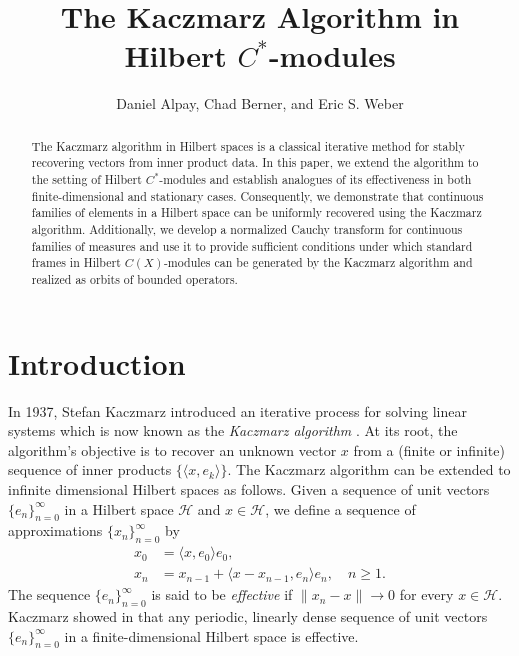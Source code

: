 \documentclass[11pt]{amsart}
\title{The Kaczmarz Algorithm in Hilbert $C^{*}$-modules}
\author{Daniel Alpay, Chad Berner, and Eric S. Weber}
\theoremstyle{definition}
\numberwithin{equation}{section}
\begin{document}
\maketitle

\begin{abstract}
The Kaczmarz algorithm in Hilbert spaces is a classical iterative method for stably recovering vectors from inner product data. In this paper, we extend the algorithm to the setting of Hilbert $C^*$-modules and establish analogues of its effectiveness in both finite-dimensional and stationary cases. Consequently, we demonstrate that continuous families of elements in a Hilbert space can be uniformly recovered using the Kaczmarz algorithm. Additionally, we develop a normalized Cauchy transform for continuous families of measures and use it to provide sufficient conditions under which standard frames in Hilbert $C(X)$-modules can be generated by the Kaczmarz algorithm and realized as orbits of bounded operators.
\end{abstract}

\section{Introduction}

In 1937, Stefan Kaczmarz introduced an iterative process for solving linear systems which is now known as the \textit{Kaczmarz algorithm} \cite{Kaczmarz1993Approximate}.   At its root, the algorithm's objective is to recover an unknown vector $x$ from a (finite or infinite) sequence of inner products $\{ \langle x, e_{k} \rangle \}$. The Kaczmarz algorithm can be extended to infinite dimensional Hilbert spaces \cite{Kwapien2001Kaczmarz,Haller2005Kaczmarz} as follows.  Given a sequence of unit vectors $\{e_n\}_{n=0}^{\infty}$ in a Hilbert space $\mathcal{H}$ and $x \in \mathcal{H}$, we define a sequence of approximations $\{x_n\}_{n=0}^{\infty}$ by
\begin{equation}\label{defn:ka}
\begin{aligned}
		x_0 &= \langle x, e_0 \rangle e_0, \\
		x_n &= x_{n-1} + \langle x- x_{n-1}, e_n \rangle e_n, \quad n \geq 1.
\end{aligned}
\end{equation}
The sequence $\{e_n\}_{n=0}^{\infty}$ is said to be \textit{effective} if $\| x_n - x \| \to 0$ for every $x \in \mathcal{H}$. Kaczmarz showed in \cite{Kaczmarz1993Approximate} that any periodic, linearly dense sequence of unit vectors $\{e_n\}_{n = 0}^{\infty}$ in a finite-dimensional Hilbert space is effective. 
\end{document}
